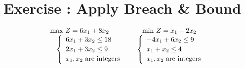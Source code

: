 \section*{Exercise : Apply Breach \& Bound}

\vspace{0.5cm}
\[
\begin{array}{c@{\hspace{1.25cm}}c}
    \text{max } Z = 6x_1 + 8x_2 & \text{min } Z = x_1 - 2x_2\\[0pt]
    
    \multicolumn{1}{c}{
    \left\{
    \begin{array}{l}
        6x_{1} + 3x_{2} \leq 18 \\[2pt]
        2x_{1} + 3x_{2} \leq 9 \\[2pt]
        x_{1}, x_{2} \text{ are integers}
    \end{array}
    \right.
    } 
    &
    \multicolumn{1}{c}{
    \left\{
    \begin{array}{l}
        -4x_{1} + 6x_{2} \leq 9 \\[2pt]
        x_{1} + x_{2}\leq 4 \\[2pt]
        x_{1}, x_{2}\text{ are integers} 
    \end{array}
    \right.
    }
\end{array}
\]


